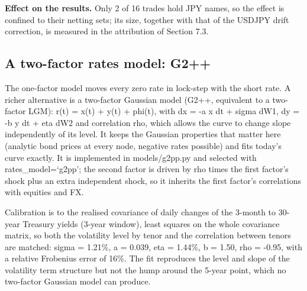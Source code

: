 \documentclass[11pt,letterpaper]{article}
\begin{document}
\textbf{Effect on the results.} Only 2 of 16 trades hold JPY names, so the effect is confined to their netting sets; its size, together with that of the USDJPY drift correction, is measured in the attribution of Section 7.3.

\subsection{A two-factor rates model: G2++}
The one-factor model moves every zero rate in lock-step with the short rate. A richer alternative is a two-factor Gaussian model (G2++, equivalent to a two-factor LGM): r(t) = x(t) + y(t) + phi(t), with dx = -a x dt + sigma dW1, dy = -b y dt + eta dW2 and correlation rho, which allows the curve to change slope independently of its level. It keeps the Gaussian properties that matter here (analytic bond prices at every node, negative rates possible) and fits today's curve exactly. It is implemented in models/g2pp.py and selected with rates\_model=`g2pp'; the second factor is driven by rho times the first factor's shock plus an extra independent shock, so it inherits the first factor's correlations with equities and FX.

Calibration is to the realised covariance of daily changes of the 3-month to 30-year Treasury yields (3-year window), least squares on the whole covariance matrix, so both the volatility level by tenor and the correlation between tenors are matched: sigma = 1.21\%, a = 0.039, eta = 1.44\%, b = 1.50, rho = -0.95, with a relative Frobenius error of 16\%. The fit reproduces the level and slope of the volatility term structure but not the hump around the 5-year point, which no two-factor Gaussian model can produce.
\end{document}
